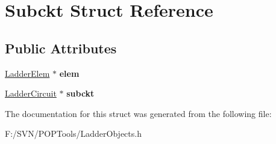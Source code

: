 \hypertarget{struct_subckt}{\section{Subckt Struct Reference}
\label{struct_subckt}
}
\subsection*{Public Attributes}
\begin{DoxyCompactItemize}
\item 
\hypertarget{struct_subckt_a3e1dea91acbcc8625dccd8cf573543d1}{\hyperlink{class_ladder_elem}{Ladder\-Elem} $\ast$ {\bfseries elem}}\label{struct_subckt_a3e1dea91acbcc8625dccd8cf573543d1}

\item 
\hypertarget{struct_subckt_a824a86a9713c4570df8fc560eb7317b8}{\hyperlink{class_ladder_circuit}{Ladder\-Circuit} $\ast$ {\bfseries subckt}}\label{struct_subckt_a824a86a9713c4570df8fc560eb7317b8}

\end{DoxyCompactItemize}


The documentation for this struct was generated from the following file\-:\begin{DoxyCompactItemize}
\item 
F\-:/\-S\-V\-N/\-P\-O\-P\-Tools/Ladder\-Objects.\-h\end{DoxyCompactItemize}
